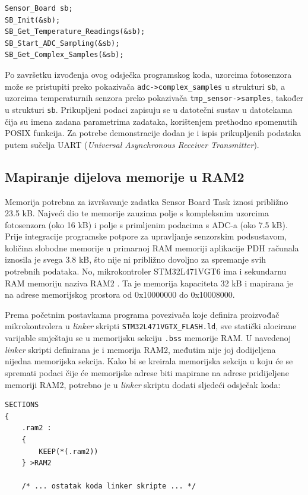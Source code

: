 \begin{lstlisting}
Sensor_Board sb;
SB_Init(&sb);
SB_Get_Temperature_Readings(&sb);
SB_Start_ADC_Sampling(&sb);
SB_Get_Complex_Samples(&sb);
\end{lstlisting}

Po završetku izvođenja ovog odsječka programskog koda, uzorcima fotosenzora može se pristupiti preko pokazivača \texttt{adc->complex\_samples} u strukturi \texttt{sb}, a uzorcima temperaturnih senzora preko pokazivača \texttt{tmp\_sensor->samples}, također u strukturi \texttt{sb}. Prikupljeni podaci zapisuju se u datotečni sustav u datotekama čija su imena zadana parametrima zadataka, korištenjem prethodno spomenutih POSIX funkcija. Za potrebe demonstracije dodan je i ispis prikupljenih podataka putem sučelja UART (\textit{Universal Asynchronous Receiver Transmitter}).

\subsection{Mapiranje dijelova memorije u RAM2}

Memorija potrebna za izvršavanje zadatka Sensor Board Task iznosi približno 23.5 kB. Najveći dio te memorije zauzima polje s kompleksnim uzorcima fotosenzora (oko 16 kB) i polje s primljenim podacima s ADC-a (oko 7.5 kB). Prije integracije programske potpore za upravljanje senzorskim podsustavom, količina slobodne memorije u primarnoj RAM memoriji aplikacije PDH računala iznosila je svega 3.8 kB, što nije ni približno dovoljno za spremanje svih potrebnih podataka. No, mikrokontroler STM32L471VGT6 ima i sekundarnu RAM memoriju naziva RAM2 \cite{stm32l4_manual}. Ta je memorija kapaciteta 32 kB i mapirana je na adrese memorijskog prostora od 0x10000000 do 0x10008000.

Prema početnim postavkama programa povezivača  koje definira proizvođač mikrokontrolera u \textit{linker} skripti \texttt{STM32L471VGTX\_FLASH.ld}, sve statički alocirane varijable smještaju se u memorijsku sekciju \texttt{.bss} memorije RAM. U navedenoj \textit{linker} skripti definirana je i memorija RAM2, međutim nije joj dodijeljena nijedna memorijska sekcija. Kako bi se kreirala memorijska sekcija u koju će se spremati podaci čije će memorijske adrese biti mapirane na adrese pridijeljene memoriji RAM2, potrebno je u \textit{linker} skriptu dodati sljedeći odsječak koda:

\begin{lstlisting}
SECTIONS
{
    .ram2 :
    {
        KEEP(*(.ram2))
    } >RAM2

    /* ... ostatak koda linker skripte ... */
\end{lstlisting}

